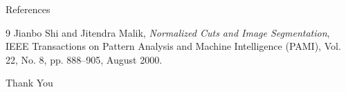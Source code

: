\documentclass[aspectratio=169]{beamer}
\begin{document}
\begin{frame}{References}

    \begin{thebibliography}{9}
        Jianbo Shi and Jitendra Malik,
        \emph{Normalized Cuts and Image Segmentation},
        IEEE Transactions on Pattern Analysis and Machine Intelligence (PAMI), Vol. 22, No. 8, pp. 888--905, August 2000.
    \end{thebibliography}

    \vspace{1cm}
    \centering
    {\Large Thank You}

\end{frame}
\end{document}
